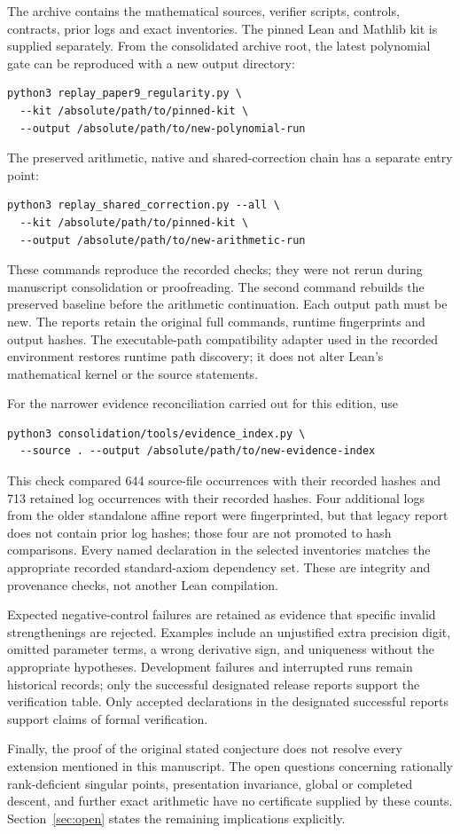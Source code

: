 The archive contains the mathematical sources, verifier scripts, controls,
contracts, prior logs and exact inventories. The pinned Lean and Mathlib kit
is supplied separately. From the consolidated archive root, the latest
polynomial gate can be reproduced with a new output directory:
\begin{verbatim}
python3 replay_paper9_regularity.py \
  --kit /absolute/path/to/pinned-kit \
  --output /absolute/path/to/new-polynomial-run
\end{verbatim}
The preserved arithmetic, native and shared-correction chain has a separate
entry point:
\begin{verbatim}
python3 replay_shared_correction.py --all \
  --kit /absolute/path/to/pinned-kit \
  --output /absolute/path/to/new-arithmetic-run
\end{verbatim}
These commands reproduce the recorded checks; they were not rerun during
manuscript consolidation or proofreading. The second command rebuilds
the preserved baseline before the arithmetic continuation. Each output path
must be new. The reports retain the original full commands, runtime
fingerprints and output hashes. The executable-path compatibility adapter
used in the recorded environment restores runtime path discovery; it does
not alter Lean's mathematical kernel or the source statements.

For the narrower evidence reconciliation carried out for this edition, use
\begin{verbatim}
python3 consolidation/tools/evidence_index.py \
  --source . --output /absolute/path/to/new-evidence-index
\end{verbatim}
This check compared 644 source-file occurrences with their recorded hashes
and 713 retained log occurrences with their recorded hashes. Four additional
logs from the older standalone affine report were fingerprinted, but that
legacy report does not contain prior log hashes; those four are not promoted
to hash comparisons. Every named declaration in the selected inventories
matches the appropriate recorded standard-axiom dependency set. These are
integrity and provenance checks, not another Lean compilation.

Expected negative-control failures are retained as evidence that specific
invalid strengthenings are rejected. Examples include an unjustified extra
precision digit, omitted parameter terms, a wrong derivative sign, and
uniqueness without the appropriate hypotheses. Development failures and
interrupted runs remain historical records; only the successful designated
release reports support the verification table. Only accepted declarations in the designated successful reports support
claims of formal verification.

Finally, the proof of the original stated conjecture does not resolve every
extension mentioned in this manuscript. The open questions concerning
rationally rank-deficient singular points, presentation invariance, global
or completed descent, and further exact arithmetic have no certificate
supplied by these counts. Section~\ref{sec:open} states the remaining implications explicitly.
